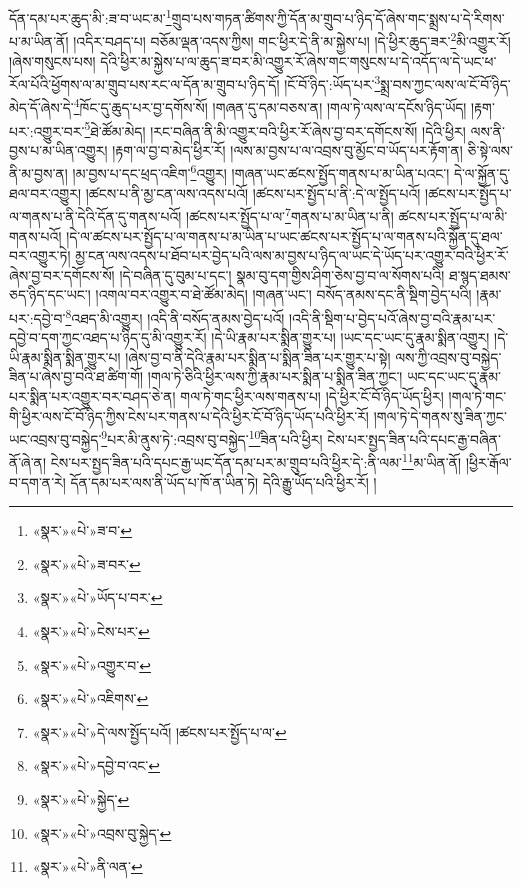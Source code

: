 དོན་དམ་པར་ཆུད་མི་:ཟ་བ་ཡང་མ་\footnote{«སྣར་»«པེ་»ཟ་བ་}གྲུབ་པས་གཏན་ཚིགས་ཀྱི་དོན་མ་གྲུབ་པ་ཉིད་དོ་ཞེས་གང་སྨྲས་པ་དེ་རིགས་པ་མ་ཡིན་ནོ། །འདིར་བཤད་པ། བཅོམ་ལྡན་འདས་ཀྱིས། གང་ཕྱིར་དེ་ནི་མ་སྐྱེས་པ། །དེ་ཕྱིར་ཆུད་ཟར་\footnote{«སྣར་»«པེ་»ཟ་བར་}མི་འགྱུར་རོ། །ཞེས་གསུངས་པས། དེའི་ཕྱིར་མ་སྐྱེས་པ་ལ་ཆུད་ཟ་བར་མི་འགྱུར་རོ་ཞེས་གང་གསུངས་པ་དེ་འདོད་ལ་དེ་ཡང་ཕ་རོལ་པོའི་ཕྱོགས་ལ་མ་གྲུབ་པས་རང་ལ་དོན་མ་གྲུབ་པ་ཉིད་དོ། །ངོ་བོ་ཉིད་:ཡོད་པར་\footnote{«སྣར་»«པེ་»ཡོད་པ་བར་}སྨྲ་བས་ཀྱང་ལས་ལ་ངོ་བོ་ཉིད་མེད་དོ་ཞེས་དེ་\footnote{«སྣར་»«པེ་»ངེས་པར་}ཁོང་དུ་ཆུད་པར་བྱ་དགོས་སོ། །གཞན་དུ་དམ་བཅས་ན། །གལ་ཏེ་ལས་ལ་དངོས་ཉིད་ཡོད། །རྟག་པར་:འགྱུར་བར་\footnote{«སྣར་»«པེ་»འགྱུར་བ་}ཐེ་ཚོམ་མེད། །རང་བཞིན་ནི་མི་འགྱུར་བའི་ཕྱིར་རོ་ཞེས་བྱ་བར་དགོངས་སོ། །དེའི་ཕྱིར། ལས་ནི་བྱས་པ་མ་ཡིན་འགྱུར། །རྟག་ལ་བྱ་བ་མེད་ཕྱིར་རོ། །ལས་མ་བྱས་པ་ལ་འབྲས་བུ་མྱོང་བ་ཡོད་པར་རྟོག་ན། ཅི་སྟེ་ལས་ནི་མ་བྱས་ན། །མ་བྱས་པ་དང་ཕྲད་འཇིག་\footnote{«སྣར་»«པེ་»འཇིགས་}འགྱུར། །གཞན་ཡང་ཚངས་སྤྱོད་གནས་པ་མ་ཡིན་པའང་། དེ་ལ་སྐྱོན་དུ་ཐལ་བར་འགྱུར། །ཚངས་པ་ནི་མྱ་ངན་ལས་འདས་པའོ། །ཚངས་པར་སྤྱོད་པ་ནི་:དེ་ལ་སྤྱོད་པའོ། །ཚངས་པར་སྤྱོད་པ་ལ་གནས་པ་ནི་དེའི་དོན་དུ་གནས་པའོ། །ཚངས་པར་སྤྱོད་པ་ལ་\footnote{«སྣར་»«པེ་»དེ་ལས་སྤྱོད་པའོ། །ཚངས་པར་སྤྱོད་པ་ལ་}གནས་པ་མ་ཡིན་པ་ནི། ཚངས་པར་སྤྱོད་པ་ལ་མི་གནས་པའོ། །དེ་ལ་ཚངས་པར་སྤྱོད་པ་ལ་གནས་པ་མ་ཡིན་པ་ཡང་ཚངས་པར་སྤྱོད་པ་ལ་གནས་པའི་སྐྱོན་དུ་ཐལ་བར་འགྱུར་ཏེ། མྱ་ངན་ལས་འདས་པ་ཐོབ་པར་བྱེད་པའི་ལས་མ་བྱས་པ་ཉིད་ལ་ཡང་དེ་ཡོད་པར་འགྱུར་བའི་ཕྱིར་རོ་ཞེས་བྱ་བར་དགོངས་སོ། །དེ་བཞིན་དུ་བུམ་པ་དང་། སྣམ་བུ་དག་གྱིས་ཤིག་ཅེས་བྱ་བ་ལ་སོགས་པའི། ཐ་སྙད་ཐམས་ཅད་ཉིད་དང་ཡང་། །འགལ་བར་འགྱུར་བ་ཐེ་ཚོམ་མེད། །གཞན་ཡང་། བསོད་ནམས་དང་ནི་སྡིག་བྱེད་པའི། །རྣམ་པར་:དབྱེ་བ་\footnote{«སྣར་»«པེ་»དབྱེ་བ་འང་}འཐད་མི་འགྱུར། །འདི་ནི་བསོད་ནམས་བྱེད་པའོ། །འདི་ནི་སྡིག་པ་བྱེད་པའོ་ཞེས་བྱ་བའི་རྣམ་པར་དབྱེ་བ་དག་ཀྱང་འཐད་པ་ཉིད་དུ་མི་འགྱུར་རོ། །དེ་ཡི་རྣམ་པར་སྨིན་གྱུར་པ། །ཡང་དང་ཡང་དུ་རྣམ་སྨིན་འགྱུར། །དེ་ཡི་རྣམ་སྨིན་སྨིན་གྱུར་པ། །ཞེས་བྱ་བ་ནི་དེའི་རྣམ་པར་སྨིན་པ་སྨིན་ཟིན་པར་གྱུར་པ་སྟེ། ལས་ཀྱི་འབྲས་བུ་བསྐྱེད་ཟིན་པ་ཞེས་བྱ་བའི་ཐ་ཚིག་གོ། །གལ་ཏེ་ཅིའི་ཕྱིར་ལས་ཀྱི་རྣམ་པར་སྨིན་པ་སྨིན་ཟིན་ཀྱང་། ཡང་དང་ཡང་དུ་རྣམ་པར་སྨིན་པར་འགྱུར་བར་བཤད་ཅེ་ན། གལ་ཏེ་གང་ཕྱིར་ལས་གནས་པ། །དེ་ཕྱིར་ངོ་བོ་ཉིད་ཡོད་ཕྱིར། །གལ་ཏེ་གང་གི་ཕྱིར་ལས་ངོ་བོ་ཉིད་ཀྱིས་ངེས་པར་གནས་པ་དེའི་ཕྱིར་ངོ་བོ་ཉིད་ཡོད་པའི་ཕྱིར་རོ། །གལ་ཏེ་དེ་གནས་སུ་ཟིན་ཀྱང་ཡང་འབྲས་བུ་བསྐྱེད་\footnote{«སྣར་»«པེ་»སྐྱེད་}པར་མི་ནུས་ཏེ་:འབྲས་བུ་བསྐྱེད་\footnote{«སྣར་»«པེ་»འབྲས་བུ་སྐྱེད་}ཟིན་པའི་ཕྱིར། ངེས་པར་སྤྱད་ཟིན་པའི་དཔང་རྒྱ་བཞིན་ནོ་ཞེ་ན། ངེས་པར་སྤྱད་ཟིན་པའི་དཔང་རྒྱ་ཡང་དོན་དམ་པར་མ་གྲུབ་པའི་ཕྱིར་དེ་:ནི་ལམ་\footnote{«སྣར་»«པེ་»ནི་ལན་}མ་ཡིན་ནོ། །ཕྱིར་རྒོལ་བ་དག་ན་རེ། དོན་དམ་པར་ལས་ནི་ཡོད་པ་ཁོ་ན་ཡིན་ཏེ། དེའི་རྒྱུ་ཡོད་པའི་ཕྱིར་རོ། །
